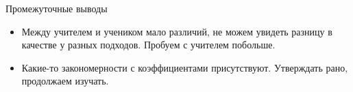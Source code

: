\documentclass{beamer}
\begin{document}
\begin{frame}{Промежуточные выводы}
    \begin{itemize}
        \item Между учителем и учеником мало различий, не можем увидеть разницу в качестве у разных подходов.
              Пробуем с учителем побольше.
        \item Какие-то закономерности с коэффициентами присутствуют. Утверждать рано, продолжаем изучать.
    \end{itemize}
\end{frame}

\end{document}
